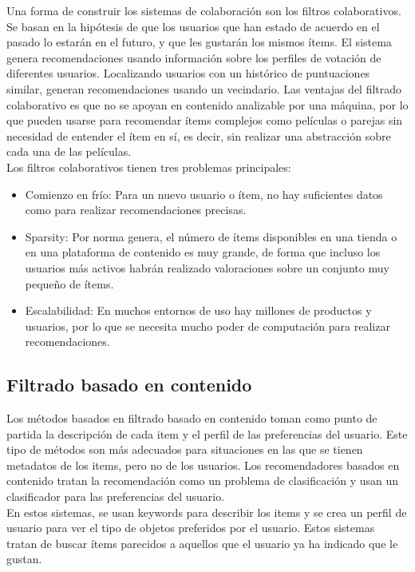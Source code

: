 Una forma de construir los sistemas de colaboración son los filtros colaborativos. Se basan en la hipótesis de que los usuarios que han estado de acuerdo en el pasado lo estarán en el futuro, y que les gustarán los mismos ítems. El sistema genera recomendaciones usando información sobre los perfiles de votación de diferentes usuarios. Localizando usuarios con un histórico de puntuaciones similar, generan recomendaciones usando un vecindario. Las ventajas del filtrado colaborativo es que no se apoyan en contenido analizable por una máquina, por lo que pueden usarse para recomendar ítems complejos como películas o parejas sin necesidad de entender el ítem en sí, es decir, sin realizar una abstracción sobre cada una de las películas.\\

Los filtros colaborativos tienen tres problemas principales:

\begin{itemize}
    \item Comienzo en frío: Para un nuevo usuario o ítem, no hay suficientes datos como para realizar recomendaciones precisas.
    \item Sparsity: Por norma genera, el número de ítems disponibles en una tienda o en una plataforma de contenido es muy grande, de forma que incluso los usuarios más activos habrán realizado valoraciones sobre un conjunto muy pequeño de ítems.
    \item Escalabilidad: En muchos entornos de uso hay millones de productos y usuarios, por lo que se necesita mucho poder de computación para realizar recomendaciones.
\end{itemize}

\subsection{Filtrado basado en contenido}

Los métodos basados en filtrado basado en contenido toman como punto de partida la descripción de cada item y el perfil de las preferencias del usuario. Este tipo de métodos son más adecuados para situaciones en las que se tienen metadatos de los items, pero no de los usuarios. Los recomendadores basados en contenido tratan la recomendación como un problema de clasificación y usan un clasificador para las preferencias del usuario.\\

En estos sistemas, se usan keywords para describir los items y se crea un perfil de usuario para ver el tipo de objetos preferidos por el usuario. Estos sistemas tratan de buscar ítems parecidos a aquellos que el usuario ya ha indicado que le gustan.\\

